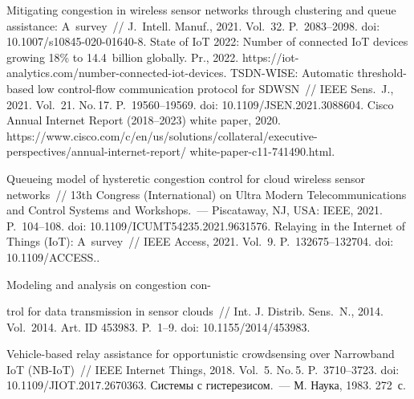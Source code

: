 \begin{multicols}{2}
\vspace*{-7pt}

{\small\frenchspacing
 {%
 \begin{thebibliography}{9}
 
 \vspace*{-2pt}
 
 Mitigating congestion in wireless sensor networks through clustering 
and queue assistance: A~survey~// J.~Intell. Manuf., 2021. Vol.~32. P.~2083--2098. 
doi: 10.1007/s10845-020-01640-8.
 State of IoT 2022: Number of connected IoT devices growing 18\% to 14.4~billion 
globally. Pr., 2022. {\sf https://iot-analytics.com/number-connected-iot-devices}.
 TSDN-WISE: Automatic threshold-based low control-flow 
communication protocol for SDWSN~// IEEE Sens.~J., 2021. Vol.~21. No.\,17.  
P.~19560--19569. doi: 10.1109/JSEN.2021.3088604.
Cisco Annual Internet Report (2018--2023) white paper, 2020. {\sf 
https://www.cisco.com/c/en/us/solutions/\linebreak collateral/executive-perspectives/annual-internet-report/ white-paper-c11-741490.html}.


 Queueing model of hysteretic congestion control for cloud 
wireless sensor networks~// 13th Congress (International) on Ultra Modern Telecommunications 
and Control Systems and Workshops.~--- Piscataway, NJ, USA: IEEE, 2021. P.~104--108. doi: 
10.1109/ICUMT54235.2021.9631576.
 Relaying in the Internet of Things (IoT): A~survey~// 
IEEE Access, 2021. Vol.~9. P.~132675--132704. doi: 10.1109/ACCESS..

 Modeling and analysis 
on congestion con-\linebreak\vspace*{-12pt}

\pagebreak

\noindent
trol for data transmission in sensor clouds~// Int. J. Distrib. Sens.~N., 
2014. Vol.~2014. Art. ID 453983. P.~1--9. doi: 10.1155/2014/453983.
 
 Vehicle-based relay assistance for opportunistic crowdsensing over 
Narrowband IoT (NB-IoT)~// IEEE Internet Things, 2018. Vol.~5. No.\,5. P.~3710--3723. 
doi: 10.1109/JIOT.2017.2670363.
 Системы с гистерезисом.~--- М. Наука, 1983. 
272~с.

\end{thebibliography}

 }
 }

\end{multicols}

